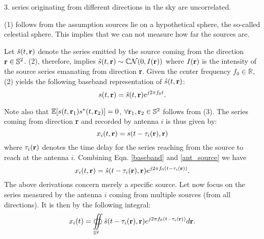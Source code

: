 \documentclass[article]{imsart}
\begin{document}
3.  series originating from different directions in the sky are uncorrelated.  
  
(1) follows from the assumption sources lie on a hypothetical sphere, the so-called celestial sphere. This implies that we can not measure how far the sources are.
 \vspace{3mm}
 
Let $\hat{s}(t,{\bf r})$ denote the series emitted by the source coming from the direction ${\bf r} \in \mathbb{S}^2$. (2), therefore, implies $\hat{s}(t,{\bf r}) \sim \mathbb{C}\mathcal{N}(0,I(\bf{r}))$ where $I(\bf{r})$ is the intensity of the source series emanating from direction {\bf r}. Given the center frequency $f_0 \in \mathbb{R}$, (2) yields the following baseband representation of $\hat{s}(t,{\bf r})$:
\begin{equation}
 s(t,{\bf r}) = \hat{s}(t,{\bf r})e^{j2\pi f_0t}.\label{baseband}
 \end{equation}
 
Note also that $\mathbb{E}[s(t,{\bf r}_1)s^*(t,{\bf r}_2)] =0$, $\forall {\bf r}_1, {\bf r}_2 \in \mathbb{S}^2$ follows from (3). 
The series coming from direction {\bf r} and recorded by antenna $i$ is thus given by:
\begin{equation}
x_i(t,{\bf r}) = s(t-\tau_{i}({\bf r}),{\bf r}) \label{ant_source}
\end{equation} 
 where $\tau_i({\bf r})$ denotes the time delay for the series reaching from the source to reach at the antenna $i$. Combining Eqn. \ref{baseband} and \ref{ant_source} we have
 \begin{equation}
 x_i(t,{\bf r}) = \hat{s}(t-\tau_{i}({\bf r}),{\bf r})e^{j2\pi f_0(t-\tau_{i}({\bf r}))}.
 \end{equation}
The above derivations concern merely a specific source. Let now focus on the series measured by the antenna $i$ coming from multiple sources (from all directions). It is then by the following integral:
\begin{equation}
x_i(t) = \oiint \displaylimits_{\mathbb{S}^2} \hat{s}(t-\tau_i({\bf r}), {\bf r})e^{j2\pi f_0(t-\tau_i({\bf r}))}d{\bf r}. \label{int_sour}
\end{equation}
 
\end{document}
